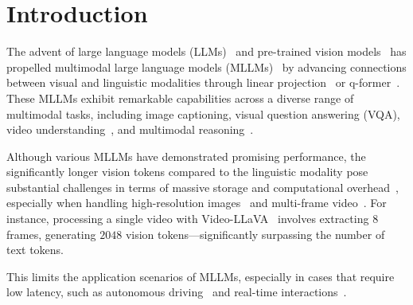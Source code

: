 \section{Introduction}\label{sec:introduction}

The advent of large language models (LLMs)~\citep{radford2019language, brown2020language, achiam2023gpt, touvron2023llama, peng2023instruction, bi2024deepseek} and pre-trained vision models~\citep{radford2021learning, liu2025grounding} has propelled multimodal large language  models (MLLMs)~\citep{team2023gemini, Qwen-VL, wang2024qwen2, chen2023internvl, li2024mini, li2023blip} by advancing connections between visual and linguistic modalities through linear projection~\citep{li2024llava} or q-former~\citep{instructblip}. 
These MLLMs exhibit remarkable capabilities across a diverse range of multimodal tasks, including image captioning, visual question answering (VQA), video understanding~\citep{wang2024internvideo2}, and multimodal reasoning~\citep{wang2024exploring}. %


Although various MLLMs have demonstrated promising performance, the significantly longer vision tokens compared to the linguistic modality pose substantial challenges in terms of massive storage and computational overhead~\citep{ju2023turbo}, especially when handling high-resolution images~\citep{li2024mini} and multi-frame video~\citep{tang2023video}.
For instance, processing a single video with Video-LLaVA~\citep{lin2023video} involves extracting $8$ frames, generating $2048$ vision tokens—significantly surpassing the number of text tokens.

This limits the application scenarios of MLLMs, especially in cases that require low latency, such as autonomous driving~\citep{jia2023adriver} and real-time interactions~\citep{fu2024vita}.



